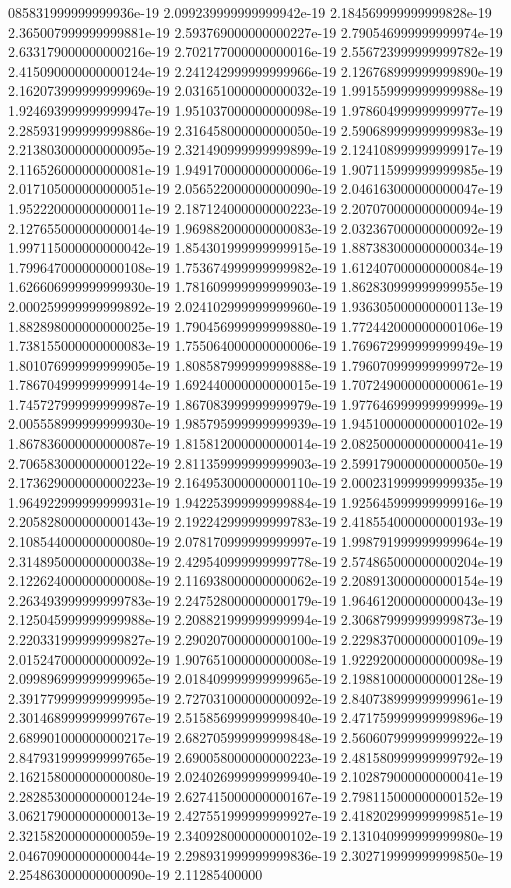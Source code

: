 085831999999999936e-19	2.099239999999999942e-19	2.184569999999999828e-19	2.365007999999999881e-19	2.593769000000000227e-19	2.790546999999999974e-19	2.633179000000000216e-19	2.702177000000000016e-19	2.556723999999999782e-19	2.415090000000000124e-19	2.241242999999999966e-19	2.126768999999999890e-19	2.162073999999999969e-19	2.031651000000000032e-19	1.991559999999999988e-19	1.924693999999999947e-19	1.951037000000000098e-19	1.978604999999999977e-19	2.285931999999999886e-19	2.316458000000000050e-19	2.590689999999999983e-19	2.213803000000000095e-19	2.321490999999999899e-19	2.124108999999999917e-19	2.116526000000000081e-19	1.949170000000000006e-19	1.907115999999999985e-19	2.017105000000000051e-19	2.056522000000000090e-19	2.046163000000000047e-19	1.952220000000000011e-19	2.187124000000000223e-19	2.207070000000000094e-19	2.127655000000000014e-19	1.969882000000000083e-19	2.032367000000000092e-19	1.997115000000000042e-19	1.854301999999999915e-19	1.887383000000000034e-19	1.799647000000000108e-19	1.753674999999999982e-19	1.612407000000000084e-19	1.626606999999999930e-19	1.781609999999999903e-19	1.862830999999999955e-19	2.000259999999999892e-19	2.024102999999999960e-19	1.936305000000000113e-19	1.882898000000000025e-19	1.790456999999999880e-19	1.772442000000000106e-19	1.738155000000000083e-19	1.755064000000000006e-19	1.769672999999999949e-19	1.801076999999999905e-19	1.808587999999999888e-19	1.796070999999999972e-19	1.786704999999999914e-19	1.692440000000000015e-19	1.707249000000000061e-19	1.745727999999999987e-19	1.867083999999999979e-19	1.977646999999999999e-19	2.005558999999999930e-19	1.985795999999999939e-19	1.945100000000000102e-19	1.867836000000000087e-19	1.815812000000000014e-19	2.082500000000000041e-19	2.706583000000000122e-19	2.811359999999999903e-19	2.599179000000000050e-19	2.173629000000000223e-19	2.164953000000000110e-19	2.000231999999999935e-19	1.964922999999999931e-19	1.942253999999999884e-19	1.925645999999999916e-19	2.205828000000000143e-19	2.192242999999999783e-19	2.418554000000000193e-19	2.108544000000000080e-19	2.078170999999999997e-19	1.998791999999999964e-19	2.314895000000000038e-19	2.429540999999999778e-19	2.574865000000000204e-19	2.122624000000000008e-19	2.116938000000000062e-19	2.208913000000000154e-19	2.263493999999999783e-19	2.247528000000000179e-19	1.964612000000000043e-19	2.125045999999999988e-19	2.208821999999999994e-19	2.306879999999999873e-19	2.220331999999999827e-19	2.290207000000000100e-19	2.229837000000000109e-19	2.015247000000000092e-19	1.907651000000000008e-19	1.922920000000000098e-19	2.099896999999999965e-19	2.018409999999999965e-19	2.198810000000000128e-19	2.391779999999999995e-19	2.727031000000000092e-19	2.840738999999999961e-19	2.301468999999999767e-19	2.515856999999999840e-19	2.471759999999999896e-19	2.689901000000000217e-19	2.682705999999999848e-19	2.560607999999999922e-19	2.847931999999999765e-19	2.690058000000000223e-19	2.481580999999999792e-19	2.162158000000000080e-19	2.024026999999999940e-19	2.102879000000000041e-19	2.282853000000000124e-19	2.627415000000000167e-19	2.798115000000000152e-19	3.062179000000000013e-19	2.427551999999999927e-19	2.418202999999999851e-19	2.321582000000000059e-19	2.340928000000000102e-19	2.131040999999999980e-19	2.046709000000000044e-19	2.298931999999999836e-19	2.302719999999999850e-19	2.254863000000000090e-19	2.11285400000